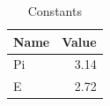 \begin{table}[htbp]
\centering
\begin{tabular}{|l|r|}
\hline
Name & Value \\
\hline
Pi & 3.14 \\
E & 2.72 \\
\hline
\end{tabular}
\caption{Constants}
\label{tab:constants}
\end{table}
